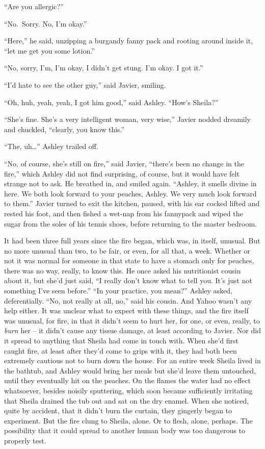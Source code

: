\documentclass[
]{article}
\begin{document}
``Are you allergic?''

``No.~Sorry. No, I'm okay.''

``Here,'' he said, unzipping a burgandy fanny pack and rooting around
inside it, ``let me get you some lotion.''

``No, sorry, I'm, I'm okay, I didn't get stung. I'm okay. I got it.''

``I'd hate to see the other guy,'' said Javier, smiling.

``Oh, huh, yeah, yeah, I got him good,'' said Ashley. ``How's Sheila?''

``She's fine. She's a very intelligent woman, very wise,'' Javier nodded
dreamily and chuckled, ``clearly, you know this.''

``The, uh\ldots{}'' Ashley trailed off.

``No, of course, she's still on fire,'' said Javier, ``there's been no
change in the fire,'' which Ashley did not find surprising, of course,
but it would have felt strange not to ask. He breathed in, and smiled
again. ``Ashley, it smells divine in here. We both look forward to your
peaches, Ashley. We very much look forward to them.'' Javier turned to
exit the kitchen, paused, with his ear cocked lifted and rested his
foot, and then fished a wet-nap from his fannypack and wiped the sugar
from the soles of his tennis shoes, before returning to the master
bedroom.

It had been three full years since the fire began, which was, in itself,
unusual. But no more unusual than two, to be fair, or even, for all
that, a week. Whether or not it was normal for someone in that state to
have a stomach only for peaches, there was no way, really, to know this.
He once asked his nutritionist cousin about it, but she'd just said, ``I
really don't know what to tell you. It's just not something I've seen
before.'' ``In your practice, you mean?'' Ashley asked, deferentially.
``No, not really at all, no,'' said his cousin. And Yahoo wasn't any
help either. It was unclear what to expect with these things, and the
fire itself was unusual, for fire, in that it didn't seem to hurt her,
for one, or even, really, to \emph{burn} her -- it didn't cause any
tissue damage, at least according to Javier. Nor did it spread to
anything that Sheila had come in touch with. When she'd first caught
fire, at least after they'd come to grips with it, they had both been
extremely cautious not to burn down the house. For an entire week Sheila
lived in the bathtub, and Ashley would bring her meals but she'd leave
them untouched, until they eventually hit on the peaches. On the flames
the water had no effect whatsoever, besides noisily sputtering, which
soon became sufficiently irritating that Sheila drained the tub out and
sat on the dry enamel. When she noticed, quite by accident, that it
didn't burn the curtain, they gingerly began to experiment. But the fire
clung to Sheila, alone. Or to flesh, alone, perhaps. The possibility
that it could spread to another human body was too dangerous to properly
test.
\end{document}
